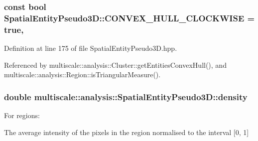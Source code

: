 \hypertarget{classmultiscale_1_1analysis_1_1SpatialEntityPseudo3D_ad92f43d2b14c77def3f7a70b54810dd2}{
\subsubsection[{C\-O\-N\-V\-E\-X\-\_\-\-H\-U\-L\-L\-\_\-\-C\-L\-O\-C\-K\-W\-I\-S\-E}]{\setlength{\rightskip}{0pt plus 5cm}const bool Spatial\-Entity\-Pseudo3\-D\-::\-C\-O\-N\-V\-E\-X\-\_\-\-H\-U\-L\-L\-\_\-\-C\-L\-O\-C\-K\-W\-I\-S\-E = true\hspace{0.3cm}{\ttfamily [static]}, {\ttfamily [protected]}}}\label{classmultiscale_1_1analysis_1_1SpatialEntityPseudo3D_ad92f43d2b14c77def3f7a70b54810dd2}


Definition at line 175 of file Spatial\-Entity\-Pseudo3\-D.\-hpp.



Referenced by multiscale\-::analysis\-::\-Cluster\-::get\-Entities\-Convex\-Hull(), and multiscale\-::analysis\-::\-Region\-::is\-Triangular\-Measure().

\hypertarget{classmultiscale_1_1analysis_1_1SpatialEntityPseudo3D_aedf807816f8c2f7cd961acfe0042fc56}{
\subsubsection[{density}]{\setlength{\rightskip}{0pt plus 5cm}double multiscale\-::analysis\-::\-Spatial\-Entity\-Pseudo3\-D\-::density\hspace{0.3cm}{\ttfamily [protected]}}}\label{classmultiscale_1_1analysis_1_1SpatialEntityPseudo3D_aedf807816f8c2f7cd961acfe0042fc56}
\begin{DoxyVerb}                 For regions:
\end{DoxyVerb}
 The average intensity of the pixels in the region normalised to the interval \mbox{[}0, 1\mbox{]}

